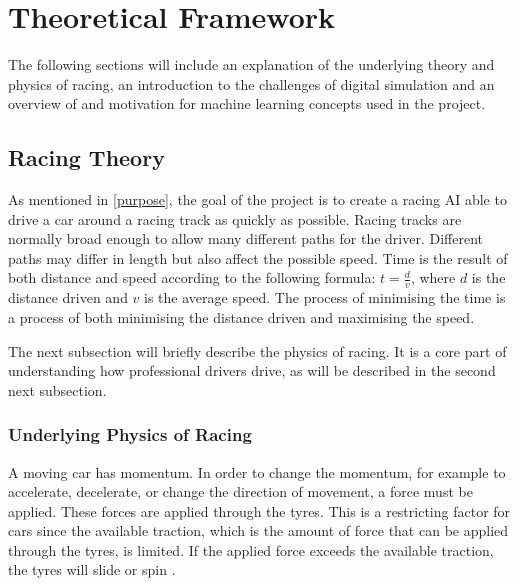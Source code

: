 \chapter{Theoretical Framework}


The following sections will include an explanation of the underlying theory and physics of racing, an introduction to the challenges of digital simulation and an overview of and motivation for machine learning concepts used in the project. 

\section{Racing Theory}
\label{racing_theory}

As mentioned in \ref{purpose}, the goal of the project is to create a racing AI able to drive a car around a racing track as quickly as possible. Racing tracks are normally broad enough to allow many different paths for the driver. Different paths may differ in length but also affect the possible speed. Time is the result of both distance and speed according to the following formula: \(t = \frac{d}{v}\), where $d$ is the distance driven and $v$ is the average speed. The process of minimising the time is a process of both minimising the distance driven and maximising the speed. 



The next subsection will briefly describe the physics of racing. It is a core part of understanding how professional drivers drive, as will be described in the second next subsection.

\subsection{Underlying Physics of Racing}
A moving car has momentum. In order to change the momentum, for example to accelerate, decelerate, or change the direction of movement, a force must be applied. These forces are applied through the tyres. This is a restricting factor for cars since the available traction, which is the amount of force that can be applied through the tyres, is limited. If the applied force exceeds the available traction, the tyres will slide or spin \cite{beckman}. 

